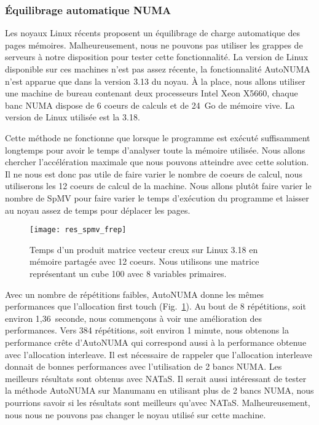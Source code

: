 \subsubsection{\'Equilibrage automatique NUMA}
Les noyaux Linux récents proposent un équilibrage de charge automatique des pages mémoires.
%
Malheureusement, nous ne pouvons pas utiliser les grappes de serveurs à notre disposition pour tester cette fonctionnalité.
%
La version de Linux disponible sur ces machines n'est pas assez récente, la fonctionnalité AutoNUMA n'est apparue que dans la version 3.13 du noyau.
%
\`A la place, nous allons utiliser une machine de bureau contenant deux processeurs Intel Xeon X5660, chaque banc NUMA dispose de 6 coeurs de calculs et de 24~Go de mémoire vive.
%
La version de Linux utilisée est la 3.18.

Cette méthode ne fonctionne que lorsque le programme est exécuté suffisamment longtemps pour avoir le temps d'analyser toute la mémoire utilisée.
%
Nous allons chercher l'accélération maximale que nous pouvons atteindre avec cette solution.
%
Il ne nous est donc pas utile de faire varier le nombre de coeurs de calcul, nous utiliserons les 12 coeurs de calcul de la machine.
%
Nous allons plutôt faire varier le nombre de SpMV pour faire varier le temps d'exécution du programme et laisser au noyau assez de temps pour déplacer les pages.

\begin{figure}
  \centering
  \texttt{[image: res\_spmv\_frep]}
  \caption{Temps d'un produit matrice vecteur creux sur Linux 3.18 en mémoire partagée avec 12 coeurs. Nous utilisons une matrice représentant un cube 100 avec 8 variables primaires.}
  \label{fig:res_spmv_frep}
\end{figure}

Avec un nombre de répétitions faibles, AutoNUMA donne les mêmes performances que l'allocation first touch (Fig.~\ref{fig:res_spmv_frep}).
%
Au bout de 8 répétitions, soit environ 1,36~seconde, nous commençons à voir une amélioration des performances.
%
Vers 384 répétitions, soit environ 1 minute, nous obtenons la performance crête d'AutoNUMA qui correspond aussi à la performance obtenue avec l'allocation interleave.
%
Il est nécessaire de rappeler que l'allocation interleave donnait de bonnes performances avec l'utilisation de 2 bancs NUMA.
%
Les meilleurs résultats sont obtenus avec NATaS.
%
Il serait aussi intéressant de tester la méthode AutoNUMA sur Manumanu en utilisant plus de 2 bancs NUMA, nous pourrions savoir si les résultats sont meilleurs qu'avec NATaS.
%
Malheureusement, nous nous ne pouvons pas changer le noyau utilisé sur cette machine.
